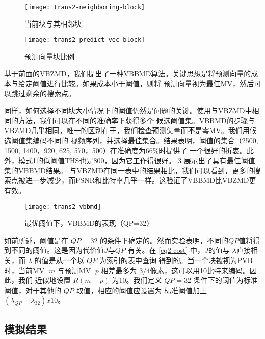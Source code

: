 \begin{figure}[H] %
  \centering
  \texttt{[image: trans2-neighboring-block]}
  \caption{当前块与其相邻块}
  \label{fig:trans2-neighboring-block}
\end{figure}

\begin{figure}[H] %
  \centering
  \texttt{[image: trans2-predict-vec-block]}
  \caption{预测向量块比例}
  \label{fig:trans2-predict-vec-block}
\end{figure}

基于前面的VBZMD，我们提出了一种VBBMD算法。关键思想是将预测向量的成本与给定阈值进行比较。如果成本小于阈值，则将
预测向量视为最佳MV，然后可以跳过剩余的搜索点。

同样，如何选择不同块大小情况下的阈值仍然是问题的关键。使用与VBZMD中相同的方法，我们可以在不同的准确率下获得多个
候选阈值集。VBBMD的步骤与VBZMD几乎相同，唯一的区别在于，我们检查预测矢量而不是零MV。我们用候选阈值集编码不同的
视频序列，并选择最佳集合。结果表明，阈值的集合（2500, 1500, 1400，920, 625, 570，500）在准确度为66\%时提供了
一个很好的折衷。此外，模式1的低阈值THS也是800，因为它工作得很好。 \ref{fig:trans2-vbbmd} 展示出了具有最佳阈值集的VBBMD结果。
与VBZMD在同一表中的结果相比，我们可以看到，更多的搜索点被进一步减少，而PSNR和比特率几乎一样。这验证了VBBMD比VBZMD更有效。

\begin{figure}[H] %
  \centering
  \texttt{[image: trans2-vbbmd]}
  \caption{最优阈值下，VBBMD的表现（QP=32）}
  \label{fig:trans2-vbbmd}
\end{figure}

如前所述，阈值是在 $QP=32$ 的条件下确定的。然而实验表明，不同的$QP$值将得到不同的阈值。这是因为代价值$J$与$QP$
有关。在 \ref{eq2-cost} 中，$J$的值与 $\lambda$直接相关，而 $\lambda$ 的值是从一个以 $QP$ 为索引的表中查询
得到的。当一个块被视为PVB时，当前MV $\;m$ 与预测MV $\;p$ 相差最多为 $3/4$像素，这可以用10比特来编码。因此，我们
近似地设置 $R(m-p)$ 为10。我们定义 $QP=32$ 条件下的阈值为标准阈值，对于其他的 $QP$ 取值，相应的阈值应设置为
标准阈值加上 $ (\lambda_{QP} - \lambda_{32}) x 10$。

\subsection{模拟结果}
\label{sec:app2-sim-result}

